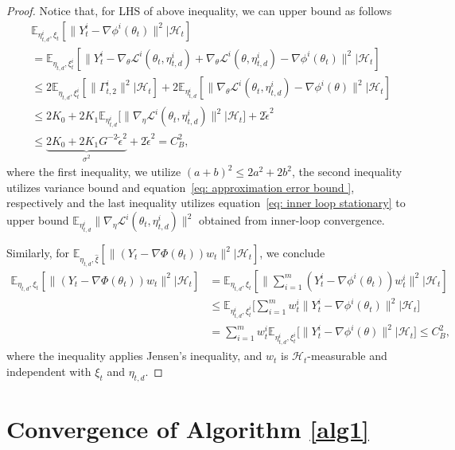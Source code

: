 \documentclass[twoside]{article} %
\def\eqref#1{equation~\ref{#1}}
\theoremstyle{plain}
\theoremstyle{definition}
\theoremstyle{remark}
\newcommand{\Y}{Y}
\newcommand{\tepsilon}{\tilde{\epsilon}}
\newcommand{\fL}{\mathcal{L}}
\newcommand{\calH}{\mathcal{H}}
\begin{document}
\begin{proof}
Notice that, for LHS of above inequality, we can upper bound as follows
\begin{align}
    &\mathbb{E}_{\eta_{t,d}^i,{\xi}_t}[\|\Y^i_t-\nabla \phi^i(\theta_t) \|^2|\calH_t]\nonumber\\
    &=\mathbb{E}_{\eta_{t,d},{\xi}^i_t}[\|\Y_t^i- \nabla_{\theta} \fL^i(\theta_t,\eta_{t,d}^i)+\nabla_{\theta} \fL^i(\theta,\eta_{t,d}^i)-\nabla\phi^i(\theta_t)\|^2|\calH_t] \nonumber\\
    &\leq {2}\mathbb{E}_{\eta_{t,d},{\xi}^i_t}[\|\Gamma_{t,2}^i \|^2|\calH_t] + 2\mathbb{E}_{\eta^i_{t,d}}[\|\nabla_{\theta}\fL^i(\theta_t, \eta_{t,d}^i)-\nabla \phi^i(\theta) \|^2|\calH_t]\nonumber\\
    &\leq  {2K_0}+{2K_1\mathbb{E}_{\eta_{t,d}^i}[\|\nabla_{\eta}\fL^i(\theta_t, \eta_{t,d}^i) \|^2}|\calH_t]+2\tepsilon^2 \nonumber\\
    &\leq \underbrace{{2K_0}+{2K_1G^{-2}}\tepsilon^2}_{\sigma^2}+2\tepsilon^2 = C_B^2, \nonumber
\end{align}
where the first inequality, we utilize $(a+b)^2\leq 2a^2+2b^2$, the second inequality utilizes variance bound  and \eqref{eq: approximation error bound }, respectively and the last inequality utilizes \eqref{eq: inner loop stationary} to upper bound $\mathbb{E}_{\eta_{t,d}^i}\|\nabla_{\eta}\fL^i(\theta_t, \eta_{t,d}^i) \|^2$ obtained from inner-loop convergence.

Similarly, for $\mathbb{E}_{\eta_{t,d},\hat{\xi}}[\|(\Y_t-\nabla \Phi(\theta_t))w_t\|^2|\calH_t]$, we conclude
\begin{align}
    \mathbb{E}_{\eta_{t,d},{\xi}_t}[\|(\Y_t-\nabla \Phi(\theta_t))w_t\|^2|\calH_t] &=\mathbb{E}_{\eta_{t,d},{\xi}_t}[\|\sum_{i=1}^{m}(Y_t^i - \nabla\phi^i(\theta_t))w_t^i\|^2|\calH_t]\nonumber\\
    &\leq \mathbb{E}_{\eta^i_{t,d},{\xi}_t^i}\big[\sum_{i=1}^{m}w_t^i \|Y_t^i-\nabla\phi^i(\theta_t)\|^2|\calH_t\big] \nonumber\\
    &= \sum_{i=1}^{m} w_t^i \mathbb{E}_{\eta_{t,d}^i,{\xi}_t^i}\big[\|Y_t^i - \nabla\phi^i(\theta) \|^2|\calH_t \big]
    \leq  C_B^2,\nonumber
\end{align}
where the inequality applies Jensen's inequality, and $w_t$ is $\calH_t$-measurable and independent with $\xi_t$ and $\eta_{t,d}$.
\end{proof}
\section{Convergence of Algorithm \ref{alg1}}\label{Appendix: proof of descent lemma algorithm 1}
\end{document}
